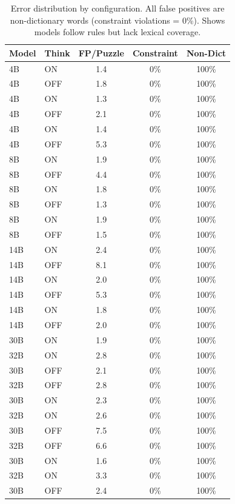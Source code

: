 \begin{table}[t]
\centering
\small
\caption{Error distribution by configuration. All false positives are non-dictionary words (constraint violations = 0\%). Shows models follow rules but lack lexical coverage.}
\label{tab:error_distribution}
\begin{tabular}{llccc}
\toprule
\textbf{Model} & \textbf{Think} & \textbf{FP/Puzzle} & \textbf{Constraint} & \textbf{Non-Dict} \\
\midrule
4B  & ON  & 1.4 & 0\% & 100\% \\
4B  & OFF & 1.8 & 0\% & 100\% \\
4B  & ON  & 1.3 & 0\% & 100\% \\
4B  & OFF & 2.1 & 0\% & 100\% \\
4B  & ON  & 1.4 & 0\% & 100\% \\
4B  & OFF & 5.3 & 0\% & 100\% \\
8B  & ON  & 1.9 & 0\% & 100\% \\
8B  & OFF & 4.4 & 0\% & 100\% \\
8B  & ON  & 1.8 & 0\% & 100\% \\
8B  & OFF & 1.3 & 0\% & 100\% \\
8B  & ON  & 1.9 & 0\% & 100\% \\
8B  & OFF & 1.5 & 0\% & 100\% \\
14B & ON  & 2.4 & 0\% & 100\% \\
14B & OFF & 8.1 & 0\% & 100\% \\
14B & ON  & 2.0 & 0\% & 100\% \\
14B & OFF & 5.3 & 0\% & 100\% \\
14B & ON  & 1.8 & 0\% & 100\% \\
14B & OFF & 2.0 & 0\% & 100\% \\
30B & ON  & 1.9 & 0\% & 100\% \\
32B & ON  & 2.8 & 0\% & 100\% \\
30B & OFF & 2.1 & 0\% & 100\% \\
32B & OFF & 2.8 & 0\% & 100\% \\
30B & ON  & 2.3 & 0\% & 100\% \\
32B & ON  & 2.6 & 0\% & 100\% \\
30B & OFF & 7.5 & 0\% & 100\% \\
32B & OFF & 6.6 & 0\% & 100\% \\
30B & ON  & 1.6 & 0\% & 100\% \\
32B & ON  & 3.3 & 0\% & 100\% \\
30B & OFF & 2.4 & 0\% & 100\% \\

\end{tabular}
\end{table}
